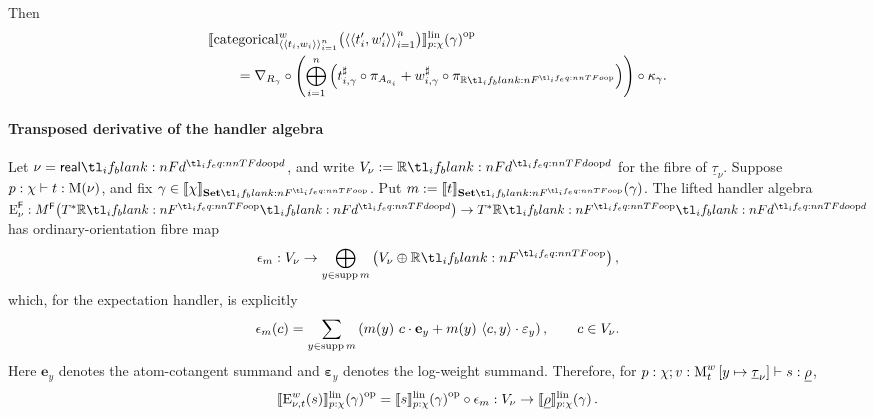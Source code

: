\documentclass[11pt,a4paper]{article}
\theoremstyle{definition}
\theoremstyle{remark}
\providecommand{\supp}{\operatorname{supp}}
\providecommand{\lintype}[1]{\underline{#1}}
\providecommand{\setint}[1]{\llbracket #1\rrbracket_{\Set}}
\providecommand{\linint}[2]{\llbracket #1\rrbracket_{#2}^{\mathrm{lin}}}
\providecommand{\vect}[1]{\mathbf{#1}}
\begin{document}
Then
\begin{equation}
  \label{eq:appendix-target-language-transpose-derivative-of-categorical}
  \begin{aligned}
  &\opmor[p]{
    \fn[n]{
      \linint{
        \fn[n]{
          \opn[b]{categorical}^{w}_{
            \tuple{\tuple{t_{i},w_{i}}}_{i=1}^{n}
          }
        }{
          \tuple{\tuple{t_{i}',w_{i}'}}_{i=1}^{n}
        }
      }{p:\chi}
    }{\gamma}
  }
  \\
  &\qquad=
  \nabla_{R_{\gamma}}
  \circ
  \left(
    \bigoplus_{i=1}^{n}
    \left(
      t^{\sharp}_{i,\gamma}\circ\pi_{A_{a_i}}
      +
      w^{\sharp}_{i,\gamma}\circ\pi_{\R}
    \right)
  \right)
  \circ
  \kappa_{\gamma}.
  \end{aligned}
\end{equation}

\paragraph{Transposed derivative of the handler algebra}
Let \(\nu=\srcreal[d]\), and write \(V_{\nu}:=\R[d]\) for the fibre of \(\lintype{\tau}_{\nu}\).  Suppose \(p:\chi\vdash t:\Fun[nn]{\opn[b]{M}}{\nu}\), and fix \(\gamma\in\setint{\chi}\).  Put \(m:=\fn[n]{\setint{t}}{\gamma}\).  The lifted handler algebra \(\opn[b]{E}^{\cat[]{F}}_{\nu}:\Fun[nn]{M^{\cat[]{F}}}{\TR[d]}\to\TR[d]\) has ordinary-orientation fibre map
\begin{equation*}
  \epsilon_{m}:V_{\nu}\to
  \bigoplus_{y\in\supp m}\left(V_{\nu}\oplus\R\right),
\end{equation*}
which, for the expectation handler, is explicitly
\begin{equation*}
  \fn[n]{\epsilon_{m}}{c}
  =
  \sum_{y\in\supp m}
  \left(
    \fn[n]{m}{y}\,c\cdot\vect{e}_{y}
    +
    \fn[n]{m}{y}\,\left\langle c,y\right\rangle\cdot\vect{\varepsilon}_{y}
  \right),
  \qquad c\in V_{\nu}.
\end{equation*}
Here \(\vect{e}_{y}\) denotes the atom-cotangent summand and \(\vect{\varepsilon}_{y}\) denotes the log-weight summand.  Therefore, for
\(p:\chi;v:\opn[b]{M}^{w}_{t}\left[y\mapsto\lintype{\tau}_{\nu}\right]\vdash s:\lintype{\rho}\),
\begin{equation}
  \label{eq:appendix-target-language-transpose-derivative-of-handler}
  \opmor[p]{
    \fn[n]{
      \linint{
        \fn[n]{\opn[b]{E}^{w}_{\nu,t}}{s}
      }{p:\chi}
    }{\gamma}
  }
  =
  \opmor[p]{
    \fn[n]{\linint{s}{p:\chi}}{\gamma}
  }
  \circ
  \epsilon_{m}
  : V_{\nu}\to
  \fn[n]{\linint{\lintype{\rho}}{p:\chi}}{\gamma}.
\end{equation}
\end{document}
